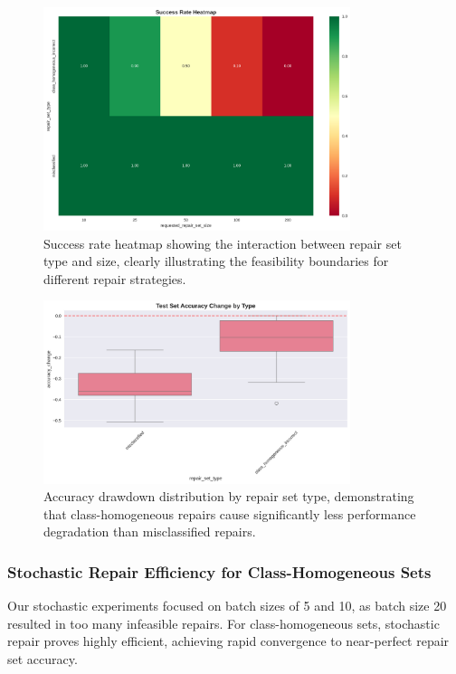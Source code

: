 \documentclass{article}
\begin{document}
\begin{figure}[h]
	\centering
	\includegraphics[width=0.8\textwidth]{results/one_shot_analysis/success_rates/success_rate_heatmap.png}
	\caption{Success rate heatmap showing the interaction between repair set type and size, clearly illustrating the feasibility boundaries for different repair strategies.}
	\label{fig:success_rate_heatmap}
\end{figure}

\begin{figure}[h]
	\centering
	\includegraphics[width=0.8\textwidth]{results/one_shot_analysis/accuracy/accuracy_change_by_type.png}
	\caption{Accuracy drawdown distribution by repair set type, demonstrating that class-homogeneous repairs cause significantly less performance degradation than misclassified repairs.}
	\label{fig:accuracy_change_by_type}
\end{figure}

\subsubsection{Stochastic Repair Efficiency for Class-Homogeneous Sets}

Our stochastic experiments focused on batch sizes of 5 and 10, as batch size 20 resulted in too many infeasible repairs. For class-homogeneous sets, stochastic repair proves highly efficient, achieving rapid convergence to near-perfect repair set accuracy.
\end{document}
